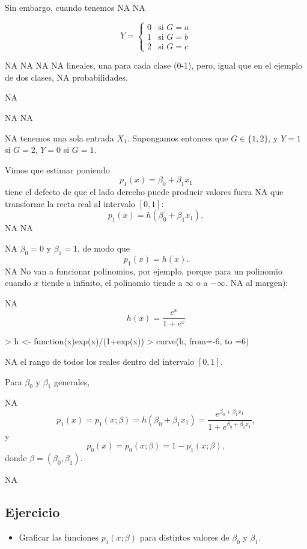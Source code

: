 \documentclass[nohyper]{tufte-handout}
\begin{document}
 Sin embargo, cuando tenemos
NA
NA
 
$$Y=\begin{cases}
0 & \mbox{si } G=a\\
1 & \mbox{si } G=b\\
2 & \mbox{si } G=c
\end{cases}
$$

NA
NA
NA
NA
lineales, una para cada clase (0-1), pero, igual que en el ejemplo de dos clases,
NA
probabilidades.

NA

NA
NA

NA
tenemos una sola entrada $X_1$. Supongamos entonces
que $G\in\{1,2\}$, y $Y=1$ si $G=2$, $Y=0$ si $G=1$. 

Vimos que estimar poniendo 
$$p_1(x)=\beta_0+\beta_1 x_1$$
tiene el defecto de que el lado derecho puede producir valores fuera
NA
que transforme la recta real al intervalo $[0,1]:$
$$p_1(x) = h(\beta_0+\beta_1 x_1),$$
NA
NA

NA
$\beta_0=0$ y $\beta_1=1$, de modo que
$$p_1(x)=h(x).$$
NA
No van a funcionar polinomios, por ejemplo, porque para un polinomio cuando
$x$ tiende a infinito, el polinomio tiende a $\infty$ o a $-\infty$.
NA
al margen):

\begin{shaded}
NA
$$h(x)=\frac{e^x}{1+e^x}$$
\end{shaded}
\begin{marginfigure}
\begin{Schunk}
\begin{Sinput}
> h <- function(x){exp(x)/(1+exp(x)) }
> curve(h, from=-6, to =6)
\end{Sinput}
\end{Schunk}
\end{marginfigure}

NA
el rango de todos los reales dentro del intervalo $[0,1]$.


Para $\beta_0$ y $\beta_1$ generales, 

\begin{shaded}
NA
$$p_1(x)=p_1(x;\beta)= h(\beta_0+\beta_1x_1)= \frac{e^{\beta_0+\beta_1x_1}}{1+ e^{\beta_0+\beta_1x_1}},$$
y $$p_0(x)=p_0(x;\beta)=1-p_1(x;\beta),$$
donde $\beta=(\beta_0,\beta_1)$.
\end{shaded}

NA

\subsection{Ejercicio}
\begin{itemize}
NA
NA
$$p_2(x)=\frac{1}{1+e^{\beta_0+\beta_1x_1}}.$$
\item Graficar las funciones $p_1(x;\beta)$ para distintos
valores de $\beta_0$ y $\beta_1$.
\end{itemize}
\end{document}
